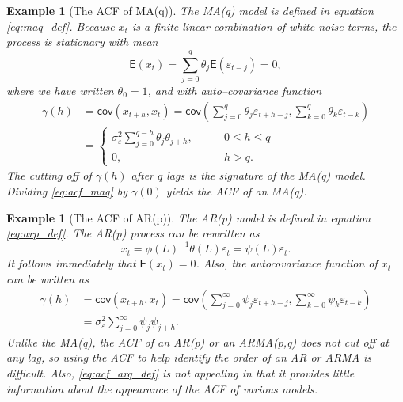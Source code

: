 \documentclass[
paper=128mm:96mm, %
fontsize=9.5pt, %
pagesize, %
parskip=half-, %
]{scrartcl} %
\theoremstyle{mythmstyle} %
\newtheorem{example}[theorem]{Example} %
\begin{document}
\begin{example}[The ACF of MA(q)]
The MA(q) model is defined in equation \eqref{eq:maq_def}. Because $x_t$ is a finite linear combination of white noise terms, the process is stationary with mean
%
\begin{equation}
\mathsf{E}\left(x_t\right)=\sum_{j=0}^q\theta_j\mathsf{E}\left(\varepsilon_{t-j}\right)=0,
\end{equation}
where we have written $\theta_0=1$, and with auto--covariance function
%
\begin{align}
\label{eq:acf_maq}
\gamma\left(h\right)&=\mathsf{cov}\left(x_{t+h},x_{t}\right)=\mathsf{cov}\left(\sum_{j=0}^q\theta_j\varepsilon_{t+h-j},\sum_{k=0}^q\theta_k\varepsilon_{t-k}\right)\nonumber\\
&=\begin{cases}
\sigma_\varepsilon^2\sum_{j=0}^{q-h}\theta_j\theta_{j+h},&\qquad 0\leq h\leq q\\
0,&\qquad h>q.
\end{cases}
\end{align}
The cutting off of $\gamma(h)$ after $q$ lags is the signature of the MA(q) model. Dividing \eqref{eq:acf_maq} by $\gamma(0)$ yields the ACF of an MA(q).
\end{example}

\clearpage


\begin{example}[The ACF of AR(p)]
The AR(p) model is defined in equation \eqref{eq:arp_def}. The AR(p) process can be rewritten as
%
\begin{equation}
x_t=\phi\left(L\right)^{-1}\theta\left(L\right)\varepsilon_t=\psi\left(L\right)\varepsilon_t.
\end{equation}
%
It follows immediately that  $\mathsf{E}\left(x_t\right)= 0$. Also, the autocovariance function of $x_t$ can be written as
%
\begin{align}
\label{eq:acf_arq_def}
\gamma\left(h\right)&=\mathsf{cov}\left(x_{t+h},x_{t}\right)=\mathsf{cov}\left(\sum_{j=0}^\infty\psi_j\varepsilon_{t+h-j},\sum_{k=0}^\infty\psi_k\varepsilon_{t-k}\right)\nonumber\\
&=\sigma_\varepsilon^2\sum_{j=0}^{\infty}\psi_j\psi_{j+h}.
\end{align}
Unlike the MA(q), the ACF of an AR(p) or an ARMA(p,q) does not cut off at any lag, so using the ACF to help identify the order of an AR or ARMA is difficult. Also, \eqref{eq:acf_arq_def} is not appealing in that it provides little information about the appearance of the ACF of various models.
\end{example}
\clearpage
\end{document}
